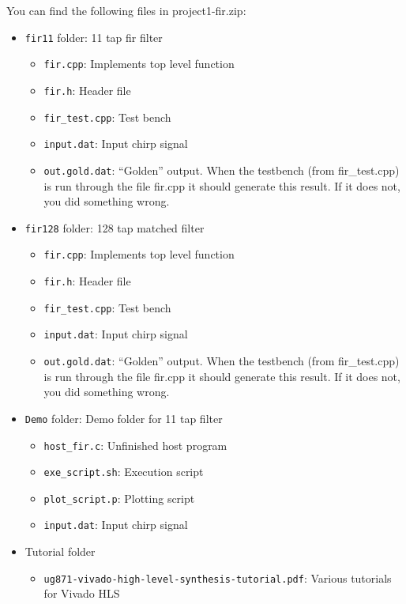 You can find the following files in project1-fir.zip:
\begin{itemize}
\item \texttt{fir11} folder: 11 tap fir filter
\begin{itemize}
\item \texttt{fir.cpp}: Implements top level function
\item \texttt{fir.h}: Header file
\item \texttt{fir\_test.cpp}: Test bench
\item \texttt{input.dat}: Input chirp signal
\item \texttt{out.gold.dat}: ``Golden'' output. When the testbench (from fir\_test.cpp) is run through the file fir.cpp it should generate this result. If it does not, you did something wrong.
\end{itemize}
\item \texttt{fir128} folder: 128 tap matched filter
\begin{itemize}
\item \texttt{fir.cpp}: Implements top level function
\item \texttt{fir.h}: Header file
\item \texttt{fir\_test.cpp}: Test bench
\item \texttt{input.dat}: Input chirp signal
\item \texttt{out.gold.dat}: ``Golden'' output. When the testbench (from fir\_test.cpp) is run through the file fir.cpp it should generate this result. If it does not, you did something wrong.
\end{itemize}
\item \texttt{Demo} folder: Demo folder for 11 tap filter
\begin{itemize}
\item \texttt{host\_fir.c}: Unfinished host program
\item \texttt{exe\_script.sh}: Execution script
\item \texttt{plot\_script.p}: Plotting script
\item \texttt{input.dat}: Input chirp signal
\end{itemize}
\item Tutorial folder
\begin{itemize}
\item \texttt{ug871-vivado-high-level-synthesis-tutorial.pdf}: Various tutorials for Vivado HLS
\end{itemize}
\end{itemize}

